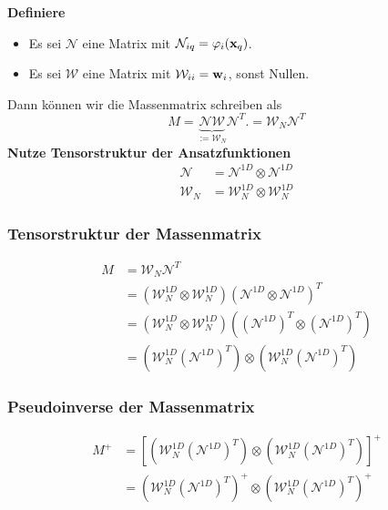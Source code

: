 \begin{frame}
\textbf{Definiere} \\
\begin{itemize}
\item Es sei $\mathcal{N}$ eine Matrix mit $\mathcal{N}_{iq}=\varphi_i(\bold{x}_q)$.
\item Es sei $\mathcal{W}$ eine Matrix mit $\mathcal{W}_{ii}=\bold{w}_i$, sonst Nullen.
\end{itemize}
Dann können wir die Massenmatrix schreiben als
\begin{equation*}
M = \underbrace{\mathcal{N} \mathcal{W}}_{:=\mathcal{W}_N} \mathcal{N}^T. = \mathcal{W}_N \mathcal{N}^T
\end{equation*}
\pause
\textbf{Nutze Tensorstruktur der Ansatzfunktionen}
\begin{equation*}
\begin{aligned}
\mathcal{N} &= \mathcal{N}^{1D} \otimes \mathcal{N}^{1D} \\
\mathcal{W}_N &= \mathcal{W}_N^{1D} \otimes \mathcal{W}_N^{1D}
\end{aligned}
\end{equation*}
\end{frame}

\begin{frame}
\frametitle{Tensorstruktur der Massenmatrix}
\begin{framed}
\begin{equation*}
\begin{aligned}
M &= \mathcal{W}_N \mathcal{N}^T \\
&= (\mathcal{W}_N^{1D} \otimes \mathcal{W}_N^{1D})(\mathcal{N}^{1D} \otimes \mathcal{N}^{1D})^T \\
&= (\mathcal{W}_N^{1D} \otimes \mathcal{W}_N^{1D})((\mathcal{N}^{1D})^T \otimes (\mathcal{N}^{1D})^T) \\
&= (\mathcal{W}_N^{1D} (\mathcal{N}^{1D})^T) \otimes  (\mathcal{W}_N^{1D} (\mathcal{N}^{1D})^T) 
\end{aligned}
\end{equation*}
\end{framed}
\end{frame}

\begin{frame}
\frametitle{Pseudoinverse der Massenmatrix}
\begin{equation*}
\begin{aligned}
M^+ & = [(\mathcal{W}_N^{1D} (\mathcal{N}^{1D})^T) \otimes  (\mathcal{W}_N^{1D} (\mathcal{N}^{1D})^T)]^+ \\ &= (\mathcal{W}_N^{1D} (\mathcal{N}^{1D})^T)^+ \otimes  (\mathcal{W}_N^{1D} (\mathcal{N}^{1D})^T)^+ 
\end{aligned}
\end{equation*}
\end{frame}






